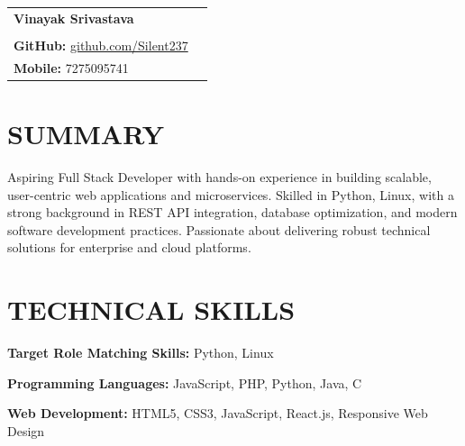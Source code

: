 \documentclass[a4paper,10.9pt]{article}
\begin{document}

\begin{tabularx}{\textwidth}{@{}X r@{}}
{\fontsize{22}{24}\selectfont\bfseries\color{hdrblue}Vinayak Srivastava} & \\[-1pt]
\vspace{1}

\begin{tabular}[t]{@{}l@{}}
{\small\textbf{LinkedIn:}
\href{https://www.linkedin.com/in/vinayak-srivastava-silent}
{linkedin.com/in/vinayak-srivastava-silent}}\\[-2pt]

{\small\textbf{GitHub:}
\href{https://github.com/Silent237}{github.com/Silent237}}
\end{tabular}

&

\begin{tabular}[t]{@{}r@{}}
{\small\textbf{Email:}
\href{mailto:vinayaksrivastava063@gmail.com}{vinayaksrivastava063@gmail.com}}\\[-2pt]

{\small\textbf{Mobile:} 7275095741}
\end{tabular}

\end{tabularx}

\vspace{-6pt}


\section*{SUMMARY}

Aspiring Full Stack Developer with hands-on experience in building scalable, user-centric web applications and microservices. Skilled in Python, Linux, with a strong background in REST API integration, database optimization, and modern software development practices. Passionate about delivering robust technical solutions for enterprise and cloud platforms.

\section*{TECHNICAL SKILLS}

\textbf{Target Role Matching Skills:} Python, Linux

\textbf{Programming Languages:} JavaScript, PHP, Python, Java, C

\textbf{Web Development:} HTML5, CSS3, JavaScript, React.js, Responsive Web Design
\end{document}
